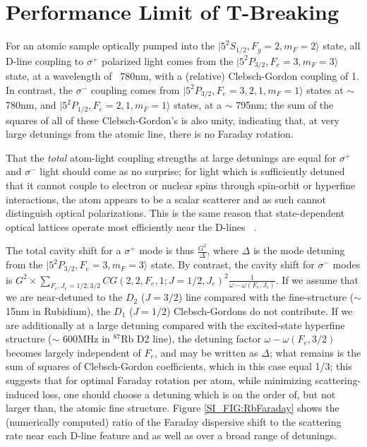 \documentclass[aps,pra,twocolumn,groupedaddress,10pt,showpacs]{revtex4-1}
\begin{document}
\section{Performance Limit of T-Breaking}
\label{App:LimitTBreak}
For an atomic sample optically pumped into the $|5^2S_{1/2},F_g=2,m_F=2\rangle$ state, all D-line coupling to $\sigma^+$ polarized light comes from the $|5^2P_{3/2},F_e=3,m_F=3\rangle$ state, at a wavelength of ~780nm, with a (relative) Clebsch-Gordon coupling of 1. In contrast, the $\sigma^-$ coupling comes from $|5^2P_{3/2},F_e={3,2,1},m_F=1\rangle$ states at $\sim$ 780nm, and $|5^2P_{1/2},F_e={2,1},m_F=1\rangle$ states, at a $\sim$ 795nm; the sum of the squares of all of these Clebsch-Gordon's is also unity, indicating that, at very large detunings from the atomic line, there is no Faraday rotation.

That the \emph{total} atom-light coupling strengths at large detunings are equal for $\sigma^+$ and $\sigma^-$ light should come as no surprise; for light which is sufficiently detuned that it cannot couple to electron or nuclear spins through spin-orbit or hyperfine interactions, the atom appears to be a scalar scatterer and as such cannot distinguish optical polarizations. This is the same reason that state-dependent optical lattices operate most efficiently near the D-lines ~\cite{mandel2003controlled}.

The total cavity shift for a $\sigma^+$ mode is thus $\frac{G^2}{\Delta}$, where $\Delta$ is the mode detuning from the $|5^2P_{3/2},F_e=3,m_F=3\rangle$ state. By contrast, the cavity shift for $\sigma^-$ modes is $G^2\times\sum_{F_e,J_e={1/2,3/2}}{CG(2,2,F_e,1;J=1/2,J_e)^2\frac{1}{\omega-\omega(F_e,J_e)}}$. If we assume that we are near-detuned to the $D_2$ ($J=3/2$) line  compared with the fine-structure ($\sim$ 15nm in Rubidium), the $D_1$ ($J=1/2$) Clebsch-Gordons do not contribute. If we are additionally at a large detuning compared with the excited-state hyperfine structure ($\sim$ 600MHz in $^{87}$Rb D2 line), the detuning factor $\omega-\omega(F_e,3/2)$ becomes largely independent of $F_e$, and may be written as $\Delta$; what remains is the sum of squares of Clebsch-Gordon coefficients, which in this case equal 1/3; this suggests that for optimal Faraday rotation per atom, while minimizing scattering-induced loss, one should choose a detuning which is on the order of, but not larger than, the atomic fine structure. Figure \ref{SI_FIG:RbFaraday} shows the (numerically computed) ratio of the Faraday dispersive shift to the scattering rate near each D-line feature and as well as over a broad range of detunings.
\end{document}
